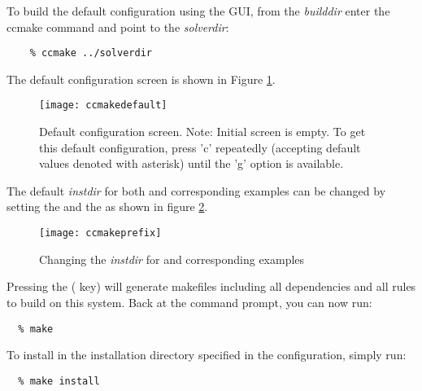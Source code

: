 To build the default configuration using the GUI, from the {\em builddir} enter
the ccmake command and point to the {\em solverdir}:

\begin{verbatim}
    % ccmake ../solverdir
\end{verbatim}

The default configuration screen is shown in Figure
\ref{f:ccmakedefault}.
\begin{figure}[!ht]
{\centerline{\texttt{[image: ccmakedefault]}}}
\caption [Initial {\em ccmake} configuration screen]
{Default configuration screen. Note: Initial screen is empty.
To get this default configuration, press 'c' repeatedly (accepting default values denoted with asterisk)
until the 'g' option is available.}
\label{f:ccmakedefault}
\end{figure}

The default {\em instdir} for both {\sundials} and corresponding examples
can be changed by setting the  and
the  as shown in figure
\ref{f:ccmakeprefix}.
\begin{figure}[!ht]
{\centerline{\texttt{[image: ccmakeprefix]}}}
\caption [Changing the {\em instdir}]
{Changing the {\em instdir} for {\sundials} and
corresponding {\id examples} }
\label{f:ccmakeprefix}
\end{figure}

Pressing the ( key) will generate makefiles including all dependencies
and all rules to build {\sundials} on this system.
Back at the command prompt, you can now run:

\begin{verbatim}
  % make
\end{verbatim}

To install {\sundials} in the installation directory specified in the configuration, simply run:

\begin{verbatim}
  % make install
\end{verbatim}



